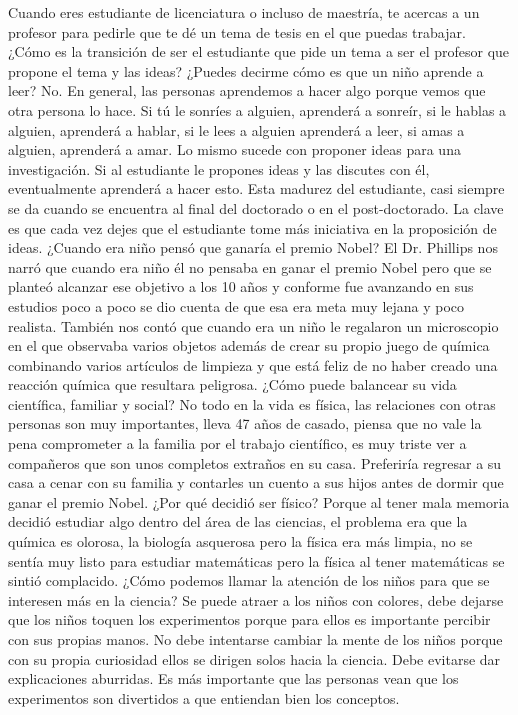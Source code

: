 \documentclass[10pt,letterpaper]{report}
\begin{document}
Cuando eres estudiante de licenciatura o incluso de maestría, te acercas a un profesor para pedirle que te dé un tema de tesis en el que puedas trabajar. ¿Cómo es la transición de ser el estudiante que pide un tema a ser el profesor que propone el tema y las ideas?
¿Puedes decirme cómo es que un niño aprende a leer? No. En general, las personas aprendemos a hacer algo porque vemos que otra persona lo hace. Si tú le sonríes a alguien, aprenderá a sonreír, si le hablas a alguien, aprenderá a hablar, si le lees a alguien aprenderá a leer, si amas a alguien, aprenderá a amar. Lo mismo sucede con proponer ideas para una investigación. Si al estudiante le propones ideas y las discutes con él, eventualmente aprenderá a hacer esto. Esta madurez del estudiante, casi siempre se da cuando se encuentra al final del doctorado o en el post-doctorado. La clave es que cada vez dejes que el estudiante tome más iniciativa en la proposición de ideas.
¿Cuando era niño pensó que ganaría el premio Nobel?
El Dr. Phillips nos narró que cuando era niño él no pensaba en ganar el premio Nobel pero que se planteó alcanzar ese objetivo a los 10 años y conforme fue avanzando en sus estudios poco a poco se dio cuenta de que esa era meta muy lejana y poco realista. También nos contó que cuando era un niño le regalaron un microscopio en el que observaba varios objetos además de crear su propio juego de química combinando varios artículos de limpieza y que está feliz de no haber creado una reacción química que resultara peligrosa.
¿Cómo puede balancear su vida científica, familiar y social?
No todo en la vida es física, las relaciones con otras personas son muy importantes, lleva 47 años de casado, piensa que no vale la pena comprometer a la familia por el trabajo científico, es muy triste ver a compañeros que son unos completos extraños en su casa. Preferiría regresar a su casa a cenar con su familia y contarles un cuento a sus hijos antes de dormir que ganar el premio Nobel.
¿Por qué decidió ser físico?
Porque al tener mala memoria decidió estudiar algo dentro del área de las ciencias, el problema era que la química es olorosa, la biología asquerosa pero la física era más limpia, no se sentía muy listo para estudiar matemáticas pero la física al tener matemáticas se sintió complacido.
¿Cómo podemos llamar la atención de los niños para que se interesen más en la ciencia?
Se puede atraer a los niños con colores, debe dejarse que los niños toquen los experimentos porque para ellos es importante percibir con sus propias manos. No debe intentarse cambiar la mente de los niños porque con su propia curiosidad ellos se dirigen solos hacia la ciencia. Debe evitarse dar explicaciones aburridas. Es más importante que las personas vean que los experimentos son divertidos a que entiendan bien los conceptos.
\end{document}
